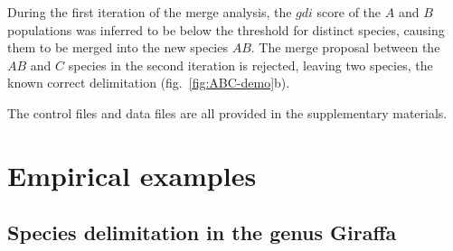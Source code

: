 \documentclass[A4]{article1}
\begin{document}
During the first iteration of the merge analysis, the $gdi$ score of the $A$ and $B$
populations was inferred to be below the threshold for distinct species, causing them to
be merged into the new species $AB$.  The merge proposal between the $AB$ and $C$ species
in the second iteration is rejected, leaving two species, the known correct delimitation
(fig.~\ref{fig:ABC-demo}b).

The control files and data files are all provided in the supplementary materials.


\section{Empirical examples}

\subsection{Species delimitation in the genus Giraffa}
\end{document}
